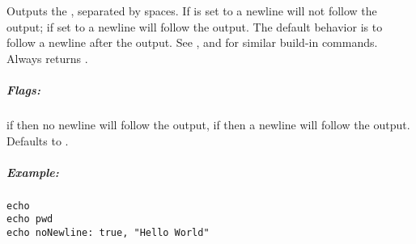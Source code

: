 \label{par:echo}

Outputs the , separated by spaces. If 
is set to  a newline will not follow the output; if set to 
a newline will follow the output. The default behavior is to follow a newline after the output.
See  ,  
and   for similar build-in commands.
Always returns .

\subparagraph{Flags:}

\begin{asparaitem}
\item[\code{noNewline: true|false}] if  then no newline will follow the output,
if  then a newline will follow the output. Defaults to .
\end{asparaitem}

\subparagraph{Example:}

\begin{lstlisting}[style=Groovybash, label={lst:example_echo}]
echo
echo pwd
echo noNewline: true, "Hello World"
\end{lstlisting}

